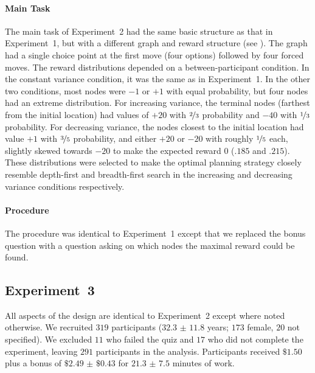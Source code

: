 \paragraph{Main Task}
The main task of Experiment~2 had the same basic structure as that in Experiment~1, but with a different graph and reward structure (see ). The graph had a single choice point at the first move (four options) followed by four forced moves. The reward distributions depended on a between-participant condition. In the constant variance condition, it was the same as in Experiment~1. In the other two conditions, most nodes were $-1$ or $+1$ with equal probability, but four nodes had an extreme distribution. For increasing variance, the terminal nodes (farthest from the initial location) had values of $+20$ with $\nicefrac{2}{3}$ probability and $-40$ with $\nicefrac{1}{3}$ probability. For decreasing variance, the nodes closest to the initial location had value $+1$ with $\nicefrac{3}{5}$ probability, and either $+20$ or $-20$ with roughly $\nicefrac{1}{5}$ each, slightly skewed towards $-20$ to make the expected reward $0$ ($.185$ and $.215$). These distributions were selected to make the optimal planning strategy closely resemble depth-first and breadth-first search in the increasing and decreasing variance conditions respectively.

\paragraph{Procedure}
The procedure was identical to Experiment~1 except that we replaced the bonus question with a question asking on which nodes the maximal reward could be found.


\subsection{Experiment~3}\label{sec:planning-methods3}
All aspects of the design are identical to Experiment~2 except where noted otherwise. We recruited $319$ participants ($32.3$ $\pm$ $11.8$ years; $173$ female, $20$ not specified). We excluded $11$ who failed the quiz and $17$ who did not complete the experiment, leaving $291$ participants in the analysis. Participants received $\$1.50$ plus a bonus of $\$2.49$ $\pm$ $\$0.43$ for $21.3$ $\pm$ $7.5$ minutes of work.

